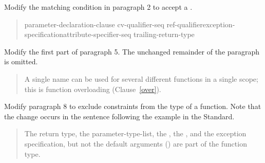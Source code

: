 Modify the matching condition in paragraph 2 to accept a 
.

\begin{quote}
\pnum\vspace{-\the\baselineskip} %

\begin{bnf}
 \terminal{(} parameter-declaration-clause \terminal{)} cv-qualifier-seq\opt\br 
  \hspace*{\bnfindentinc}ref-qualifier\opt exception-specification\opt attribute-specifier-seq\opt\br
  \hspace*{\bnfindentinc}trailing-return-type 
\end{bnf}
\end{quote}


Modify the first part of paragraph 5. The unchanged remainder of the paragraph
is omitted.

\begin{quote}
\setcounter{Paras}{4}
\pnum
A single name can be used for several different functions in a single 
scope; this is function overloading (Clause~\ref{over}). 
%
\end{quote}

Modify paragraph 8 to exclude constraints from the type of a function.
Note that the change occurs in the sentence following the example
in the \Cpp Standard.

\begin{quote}
\setcounter{Paras}{7}
\pnum
The return type, the parameter-type-list, the , 
the , and the exception specification, but not 
the default arguments ()
are part of the function type.
\end{quote}




